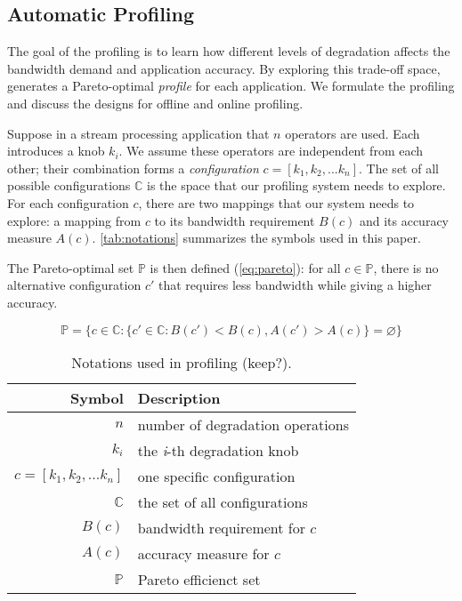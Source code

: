 \subsection{Automatic Profiling}
\label{sec:automatic-profiling}

The goal of the profiling is to learn how different levels of degradation
affects the bandwidth demand and application accuracy. By exploring this
trade-off space, \sysname{} generates a Pareto-optimal \textit{profile} for each
application. We formulate the profiling and discuss the designs for offline and
online profiling.

 Suppose in a stream processing application that $n$
\maybe{} operators are used. Each introduces a knob $k_i$. We assume these
operators are independent from each other; their combination forms a
\textit{configuration} $c = [k_{1}, k_{2}, ... k_{n}]$. The set of all possible
configurations $\mathbb{C}$ is the space that our profiling system needs to
explore. For each configuration $c$, there are two mappings that our system
needs to explore: a mapping from $c$ to its bandwidth requirement $B(c)$ and its
accuracy measure $A(c)$. \autoref{tab:notations} summarizes the symbols used in
this paper.

The Pareto-optimal set $\mathbb{P}$ is then defined (\autoref{eq:pareto}): for
all $c \in \mathbb{P}$, there is no alternative configuration $c'$ that requires
less bandwidth while giving a higher accuracy.

{\small
\begin{equation}
  \mathbb{P} = \{ c \in \mathbb{C} : \{ c' \in \mathbb{C}: B(c') < B(c),
  A(c') > A(c) \} = \varnothing\}
  \label{eq:pareto}
\end{equation}
}%

\begin{table}
  \small
  \centering
  \begin{tabular}{r l}
    \toprule
    \textbf{Symbol} & \textbf{Description} \\
    \midrule
    $n$ & number of degradation operations \\
    $k_i$ & the \textit{i}-th degradation knob \\
    $c = [k_{1}, k_{2}, ... k_{n}]$ & one specific configuration \\
    $\mathbb{C}$ & the set of all configurations \\
    \midrule
    $B(c)$ & bandwidth requirement for $c$ \\
    $A(c)$ & accuracy measure for $c$ \\
    $\mathbb{P}$ & Pareto efficienct set \\
    \bottomrule
  \end{tabular}
  \caption{Notations used in profiling (keep?).}
  \label{tab:notations}
\end{table}

